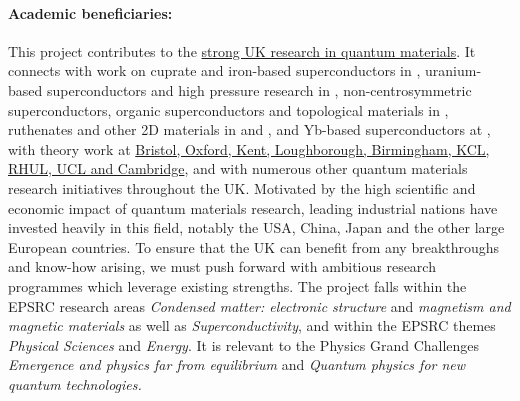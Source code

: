 \paragraph{Academic beneficiaries:}
This project contributes to the \uline{strong UK research in quantum materials}. It connects with work on cuprate and iron-based superconductors in , uranium-based superconductors and high pressure research in , non-centrosymmetric superconductors, organic superconductors and topological materials in , ruthenates and other 2D materials in  and , and Yb-based superconductors at , with theory work at \ul{Bristol, Oxford, Kent, Loughborough, Birmingham, KCL, RHUL, UCL and Cambridge}, and with numerous other quantum materials research initiatives throughout the UK.   
Motivated by  
the high scientific and economic impact of quantum materials research, leading industrial nations have
invested heavily in this field, notably the USA, China, Japan and the
other large European countries. 
To ensure that the UK 
can benefit from any breakthroughs and know-how arising, we must push
forward with ambitious research programmes which leverage existing
strengths. The project falls within the EPSRC research areas {\em Condensed matter: electronic structure} and  {\em magnetism and magnetic materials} as well as {\em Superconductivity}, and within the EPSRC themes {\em Physical Sciences}  and {\em Energy}. It is relevant to the Physics Grand Challenges {\em Emergence and physics far from equilibrium} and 
{\em Quantum physics for new quantum technologies.} 










\vspace{-1.0em}


